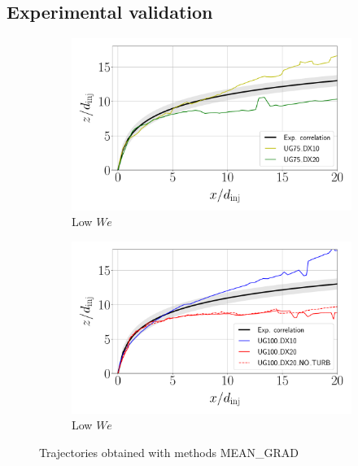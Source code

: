 \subsection{Experimental validation}

\begin{figure}[ht]
\centering
\begin{subfigure}[b]{0.45\textwidth}
	\centering
   \includegraphics[scale=0.15]{./part2_developments/figures_ch5_resolved_JICF/results_trajectories/methods_expe_validation_trajectories_q6uG75.pdf}
   \caption{Low $We$}
\end{subfigure}
\hfill
\begin{subfigure}[b]{0.45\textwidth}
	\centering
   \includegraphics[scale=0.15]{./part2_developments/figures_ch5_resolved_JICF/results_trajectories/methods_expe_validation_trajectories_q6uG100.pdf}
   \caption{Low $We$}
\end{subfigure}
\caption{Trajectories obtained with methods MEAN\_GRAD}
\label{fig:JICF_trajectories_validation}
\end{figure}

